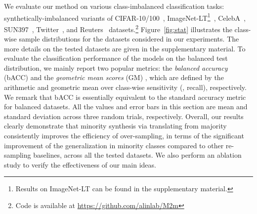 \begin{figure*}[t]
\begin{center}
    {
    }
\end{center}
\vspace{-0.05in}
\caption{An illustration of histograms on training sample sizes for the datasets used in this paper.}
\label{fig:stat}
\vspace{-0.1in}
\end{figure*}

We evaluate our method on various class-imbalanced classification tasks:
synthetically-imbalanced variants of CIFAR-10/100~\citep{dataset/cifar},
ImageNet-LT\footnote{Results on ImageNet-LT can be found in the supplementary material.}~\citep{liu2019large}, CelebA~\cite{liu2015faceattributes}, SUN397~\cite{xiao2010sun}, Twitter~\citep{gimpel2010part}, and Reuters~\citep{lewis2004rcv1} datasets.\footnote{Code is available at \url{https://github.com/alinlab/M2m}} Figure~\ref{fig:stat} illustrates the class-wise sample distributions for the datasets considered in our experiments.
The more details on the tested datasets are given in the supplementary material. To evaluate the classification performance of the models on the balanced test distribution, we mainly report two popular metrics: the \emph{balanced accuracy} (bACC) \citealt{huang2016learning, wang2017learning} and the \emph{geometric mean scores} (GM) \citealt{kubat1997addressing, branco2016survey}, which are defined by the arithmetic and geometric mean over class-wise sensitivity (\ie, recall), respectively. 
We remark that bACC is essentially equivalent to the standard accuracy metric for balanced datasets. All the values and error bars in this section are mean and standard deviation across three random trials, respectively.
Overall, our results clearly demonstrate that minority synthesis via translating from majority consistently improves the efficiency of over-sampling, in terms of the significant improvement of the generalization in minority classes compared to other re-sampling baselines, across all the tested datasets. We also perform an ablation study to verify the effectiveness of our main ideas. 

